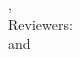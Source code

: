 \hfill
\vfill
{
	\small
	\textbf{\thesisName} \\
	\textit{\thesisTitle} \\
	\thesisSubject, \thesisDate \\
	Reviewers: \thesisFirstReviewer\ \\
 and \thesisSecondReviewer \\
	\textbf{\thesisUniversity} \\
	\textit{\thesisUniversityGroup} \\
	\thesisUniversityInstitute \\
	\thesisUniversityDepartment \\
	\thesisUniversityStreetAddress \\
	\thesisUniversityPostalCode\ \thesisUniversityCity
}
